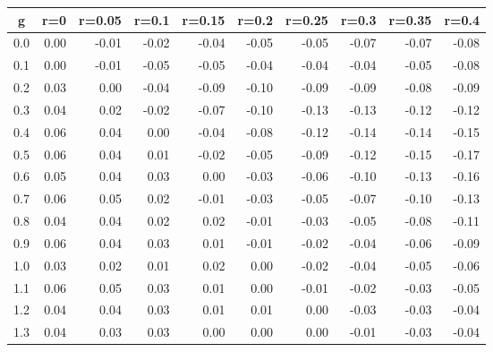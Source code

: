 %
\begin{table}[!tbp]
 \begin{center}
 \begin{tabular}{rrrrrrrrrr}\hline\hline
\multicolumn{1}{c}{g}&\multicolumn{1}{c}{r=0}&\multicolumn{1}{c}{r=0.05}&\multicolumn{1}{c}{r=0.1}&\multicolumn{1}{c}{r=0.15}&\multicolumn{1}{c}{r=0.2}&\multicolumn{1}{c}{r=0.25}&\multicolumn{1}{c}{r=0.3}&\multicolumn{1}{c}{r=0.35}&\multicolumn{1}{c}{r=0.4}\tabularnewline
\hline
0.0&0.00&-0.01&-0.02&-0.04&-0.05&-0.05&-0.07&-0.07&-0.08\tabularnewline
0.1&0.00&-0.01&-0.05&-0.05&-0.04&-0.04&-0.04&-0.05&-0.08\tabularnewline
0.2&0.03& 0.00&-0.04&-0.09&-0.10&-0.09&-0.09&-0.08&-0.09\tabularnewline
0.3&0.04& 0.02&-0.02&-0.07&-0.10&-0.13&-0.13&-0.12&-0.12\tabularnewline
0.4&0.06& 0.04& 0.00&-0.04&-0.08&-0.12&-0.14&-0.14&-0.15\tabularnewline
0.5&0.06& 0.04& 0.01&-0.02&-0.05&-0.09&-0.12&-0.15&-0.17\tabularnewline
0.6&0.05& 0.04& 0.03& 0.00&-0.03&-0.06&-0.10&-0.13&-0.16\tabularnewline
0.7&0.06& 0.05& 0.02&-0.01&-0.03&-0.05&-0.07&-0.10&-0.13\tabularnewline
0.8&0.04& 0.04& 0.02& 0.02&-0.01&-0.03&-0.05&-0.08&-0.11\tabularnewline
0.9&0.06& 0.04& 0.03& 0.01&-0.01&-0.02&-0.04&-0.06&-0.09\tabularnewline
1.0&0.03& 0.02& 0.01& 0.02& 0.00&-0.02&-0.04&-0.05&-0.06\tabularnewline
1.1&0.06& 0.05& 0.03& 0.01& 0.00&-0.01&-0.02&-0.03&-0.05\tabularnewline
1.2&0.04& 0.04& 0.03& 0.01& 0.01& 0.00&-0.03&-0.03&-0.04\tabularnewline
1.3&0.04& 0.03& 0.03& 0.00& 0.00& 0.00&-0.01&-0.03&-0.04\tabularnewline
\hline
\end{tabular}

\end{center}

\end{table}

